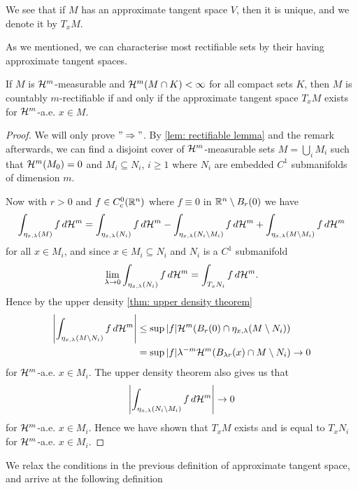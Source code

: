 We see that if $M$ has an approximate tangent space $V$, then it is unique, and we denote it by $T_xM$.

As we mentioned, we can characterise most rectifiable sets by their having approximate tangent spaces.

\begin{theorem}\label{thm: characterization of rectifiable sets}
If $M$ is $\mathcal{H}^m$-measurable and $\mathcal{H}^m(M \cap K)<\infty$ for all compact sets $K$, then $M$ is countably $m$-rectifiable if and only if the approximate tangent space $T_xM$ exists for $\mathcal{H}^m$-a.e. $x \in M$.
\end{theorem}
\begin{proof}
We will only prove $"\Rightarrow"$.
By \cref{lem: rectifiable lemma} and the remark afterwards, we can find a disjoint cover of $\mathcal{H}^m$-measurable sets $M = \bigcup_i M_i$ such that $\mathcal{H}^m(M_0)=0$ and $M_i \subseteq N_i$, $i \ge 1$ where $N_i$ are embedded $C^1$ submanifolds of dimension $m$.

Now with $r > 0$ and $f \in C_c^0(\mathbb{R}^n)$ where $f \equiv 0$ in $\mathbb{R}^n \setminus B_r(0)$ we have
\[
    \int_{\eta_{x,\lambda}(M)}f \, d\mathcal{H}^m = \int_{\eta_{x,\lambda}(N_i)}f \, d\mathcal{H}^m - \int_{\eta_{x,\lambda}(N_i \setminus M_i)}f \, d\mathcal{H}^m + \int_{\eta_{x,\lambda}(M \setminus M_i)}f \, d\mathcal{H}^m
\]
for all $x \in M_i$, and since $x \in M_i \subseteq N_i$ and $N_i$ is a $C^1$ submanifold
\[
    \lim_{\lambda \to 0} \int_{\eta_{x,\lambda}(N_i)}f \, d\mathcal{H}^m = \int_{T_xN_i} f\, d\mathcal{H}^m.
\]
Hence by the upper density \cref{thm: upper density theorem}
\begin{align*}
    \left\vert \int_{\eta_{x,\lambda}(M\setminus N_i)}f \, d\mathcal{H}^m \right\vert &\le \sup |f|\mathcal{H}^m(B_r(0) \cap \eta_{x,\lambda}(M \setminus N_i)) \\
    &= \sup |f|\lambda^{-m}\mathcal{H}^m(B_{\lambda r}(x) \cap M \setminus N_i) \to 0
\end{align*}
for $\mathcal{H}^m$-a.e. $x \in M_i$. The upper density theorem also gives us that
\[
    \left\vert \int_{\eta_{x,\lambda}(N_i\setminus M_i)}f \, d\mathcal{H}^m \right\vert \to 0
\]
for $\mathcal{H}^m$-a.e. $x \in M_i$. Hence we have shown that $T_xM$ exists and is equal to $T_xN_i$ for $\mathcal{H}^m$-a.e. $x \in M_i$.
\end{proof}

We relax the conditions in the previous definition of approximate tangent space, and arrive at the following definition

